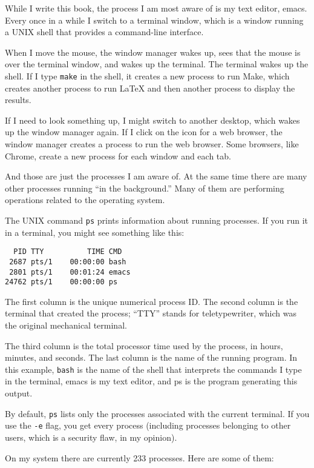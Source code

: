 \documentclass[12pt]{book}
\begin{document}
While I write this book, the process I
am most aware of is my text editor, emacs.  Every once in a while
I switch to a terminal window, which is a window running a UNIX shell
that provides a command-line interface.

When I move the mouse, the window manager wakes up, sees that the
mouse is over the terminal window, and wakes up the terminal.
The terminal wakes up the shell.
If I type {\tt make} in the shell, it creates a
new process to run Make, which creates another process to run LaTeX
and then another process to display the results.

If I need to look something up, I might switch to another desktop,
which wakes up the window manager again.  If I click on the icon for a
web browser, the window manager creates a process to run the web
browser.  Some browsers, like Chrome, create a new process for each
window and each tab.

And those are just the processes I am aware of.  At the same time
there are many other processes running ``in the background.''
Many of them are performing operations related to the operating
system.

The UNIX command {\tt ps} prints information about running processes.
If you run it in a terminal, you might see something like this:

\begin{verbatim}
  PID TTY          TIME CMD
 2687 pts/1    00:00:00 bash
 2801 pts/1    00:01:24 emacs
24762 pts/1    00:00:00 ps
\end{verbatim}

The first column is the unique numerical process ID.  The second
column is the terminal that created the process; 
``TTY'' stands for teletypewriter, which was the original
mechanical terminal.

The third column is the total processor time used by the process,
in hours, minutes, and seconds.
The last column is the name of the running program.  In
this example, {\tt bash} is the name of the shell that interprets
the commands I type in the terminal, emacs is my text editor, and
ps is the program generating this output.

By default, {\tt ps} lists only the processes associated with
the current terminal.  If you use the {\tt -e} flag, you get every
process (including processes belonging to other users, which is
a security flaw, in my opinion).

On my system there are currently 233 processes.
Here are some of them:
\end{document}
